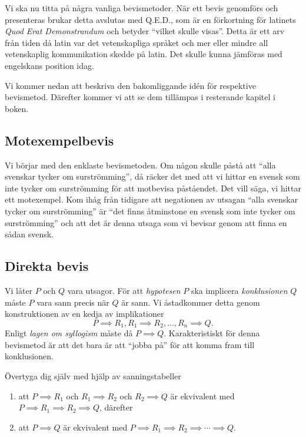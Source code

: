 Vi ska nu titta på några vanliga bevismetoder.
När ett bevis genomförs och presenteras brukar detta avslutas med 
\textsc{Q.E.D.}, som är en förkortning för latinets \emph{Quod Erat
Demonstrandum} och betyder \enquote{vilket skulle visas}.
Detta är ett arv från tiden då latin var det vetenskapliga språket och mer
eller mindre all vetenskaplig kommunikation skedde på latin.
Det skulle kunna jämföras med engelskans position idag.

Vi kommer nedan att beskriva den bakomliggande idén för respektive bevismetod.
Därefter kommer vi att se dem tillämpas i resterande kapitel i boken.

\subsection{Motexempelbevis}

Vi börjar med den enklaste bevismetoden.
Om någon skulle påstå att \enquote{alla svenskar tycker om surströmming}, då 
räcker det med att vi hittar en svensk som inte tycker om surströmming för att
motbevisa påståendet.
Det vill säga, vi hittar ett motexempel.
Kom ihåg från tidigare att negationen av utsagan \enquote{alla svenskar tycker 
om surströmming} är \enquote{det finns åtminstone en svensk som inte tycker om
surströmming} och att det är denna utsaga som vi bevisar genom att finna en
sådan svensk.

\subsection{Direkta bevis}

Vi låter \(P\) och \(Q\) vara utsagor.
För att \emph{hypotesen} \(P\) ska implicera 
\emph{konklusionen} \(Q\) måste \(P\) vara sann
precis när \(Q\) är sann.
Vi åstadkommer detta genom konstruktionen av en kedja av implikationer
\[
  P\implies R_1, R_1\implies R_2, \ldots, R_n\implies Q.
\]
Enligt \emph{lagen om syllogism} måste då \(P\implies 
Q\).
Karakteristiskt för denna bevismetod är att det bara är att \enquote{jobba på} 
för att komma fram till konklusionen.

\begin{exercise}
  Övertyga dig själv med hjälp av sanningstabeller
  \begin{enumerate}
    \item att \(P\implies R_1\) och \(R_1\implies R_2\) och \(R_2\implies Q\) 
      är ekvivalent med \(P\implies R_1\implies R_2\implies Q\), därefter
    \item att \(P\implies Q\) är ekvivalent med \(P\implies R_1\implies 
      R_2\implies \cdots\implies Q\).
  \end{enumerate}
\end{exercise}

